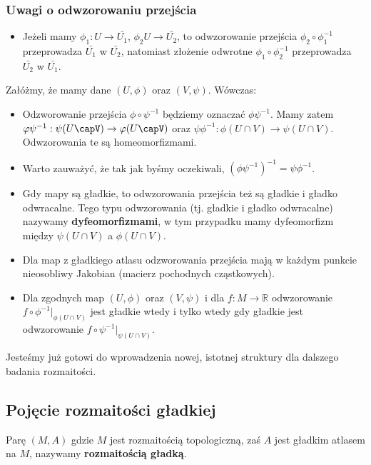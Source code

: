 \subsubsection{Uwagi o odwzorowaniu przejścia}
\begin{itemize}
	\item Jeżeli mamy $\phi_1 : U \to \bar{U_1}$, $\phi_2 U \to \bar{U_2}$, to odwzorowanie przejścia $\phi_2 \circ \phi_1^{-1}$ przeprowadza $\bar{U_1}$ w $\bar{U_2}$, natomiast złożenie odwrotne $\phi_1 \circ \phi_2^{-1}$ przeprowadza $\bar{U_2}$ w $\bar{U_1}$.
\end{itemize}
Załóżmy, że mamy dane $(U,\phi)$ oraz $(V,\psi)$. Wówczas:
\begin{itemize}
	\item Odzworowanie przejścia $\phi \circ \psi^{-1}$ będziemy oznaczać $\phi\psi^{-1}$. Mamy zatem $\phi\psi^{-1} : \psi(U\capV) \to \phi(U\capV)$ oraz $\psi\phi^{-1} : \phi(U\cap V) \to \psi(U \cap V)$. Odwzorowania te są homeomorfizmami.
	\item Warto zauważyć, że tak jak byśmy oczekiwali, $\left(\phi\psi^{-1}\right)^{-1} = \psi\phi^{-1}$.
	\item Gdy mapy są gładkie, to odwzorowania przejścia też są gładkie i gładko odwracalne. Tego typu odwzorowania (tj. gładkie i gładko odwracalne) nazywamy \textbf{dyfeomorfizmami}, w tym przypadku mamy dyfeomorfizm między $\psi(U\cap V)$ a $\phi(U \cap V)$.
	\item Dla map z gładkiego atlasu odzworowania przejścia mają w każdym punkcie nieosobliwy Jakobian (macierz pochodnych cząstkowych).
	\item Dla zgodnych map $(U,\phi)$ oraz $(V,\psi)$ i dla $f : M \to \mathbb{R}$ odwzorowanie $f \circ \phi^{-1} \big|_{\phi(U \cap V)}$ jest gładkie wtedy i tylko wtedy gdy gładkie jest odwzorowanie $f \circ \psi^{-1} \big|_{\psi(U \cap V)}$.
\end{itemize}
Jesteśmy już gotowi do wprowadzenia nowej, istotnej struktury dla dalszego badania rozmaitości.

\subsection{Pojęcie rozmaitości gładkiej}
\begin{definition} 
	Parę $(M,A)$ gdzie $M$ jest rozmaitością topologiczną, zaś $A$ jest gładkim atlasem na $M$, nazywamy \textbf{rozmaitością gładką}.
\end{definition}

